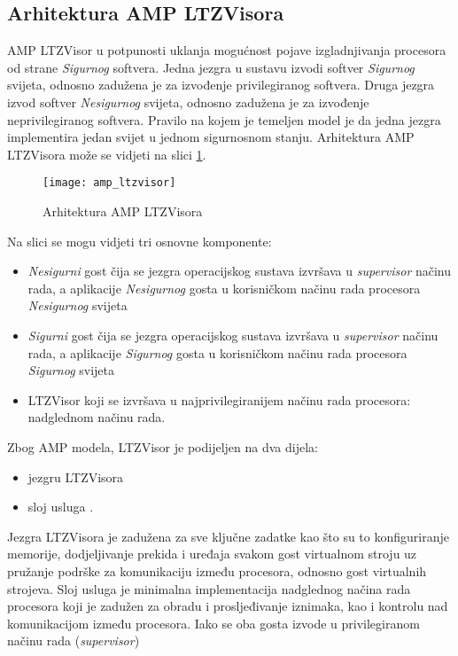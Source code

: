 \documentclass[times, utf8, diplomski, numeric]{fer}
\begin{document}
\subsection{Arhitektura AMP LTZVisora}
AMP LTZVisor u potpunosti uklanja mogućnost pojave izgladnjivanja procesora od strane \textit{Sigurnog} softvera. Jedna jezgra
u sustavu izvodi softver \textit{Sigurnog} svijeta, odnosno zadužena je za izvođenje privilegiranog softvera. Druga jezgra
izvod softver \textit{Nesigurnog} svijeta, odnosno zadužena je za izvođenje neprivilegiranog softvera. Pravilo na kojem je
temeljen model je da jedna jezgra implementira jedan svijet u jednom sigurnosnom stanju. Arhitektura AMP LTZVisora može se
vidjeti na slici \ref{amp_ltzvisor}.
\begin{figure}[H]
  \centering
  \texttt{[image: amp\_ltzvisor]}
  \caption{Arhitektura AMP LTZVisora \cite{amp_ltzvisor}}
  \label{amp_ltzvisor}
\end{figure}
Na slici se mogu vidjeti tri osnovne komponente:
\begin{itemize}
  \item {\textit{Nesigurni} gost čija se jezgra operacijskog sustava izvršava u \textit{supervisor} načinu rada, a aplikacije
  \textit{Nesigurnog} gosta u korisničkom načinu rada procesora \textit{Nesigurnog} svijeta}
  \item{\textit{Sigurni} gost čija se jezgra operacijskog sustava izvršava u \textit{supervisor} načinu rada, a aplikacije
  \textit{Sigurnog} gosta u korisničkom načinu rada procesora \textit{Sigurnog} svijeta}
  \item{LTZVisor koji se izvršava u najprivilegiranijem načinu rada procesora: nadglednom načinu rada.}
\end{itemize}
\newpage
Zbog AMP modela, LTZVisor je podijeljen na dva dijela:
\begin{itemize}
  \item {jezgru LTZVisora}
  \item{sloj usluga .}
\end{itemize}
Jezgra LTZVisora je zadužena za sve ključne zadatke kao što su to konfiguriranje memorije, dodjeljivanje prekida i uređaja
svakom gost virtualnom stroju uz pružanje podrške za komunikaciju između procesora, odnosno gost virtualnih strojeva.
Sloj usluga je minimalna implementacija nadglednog načina rada procesora koji je zadužen za obradu i prosljeđivanje iznimaka,
kao i kontrolu nad komunikacijom između procesora. Iako se oba gosta izvode u privilegiranom načinu rada (\textit{supervisor})
\end{document}

